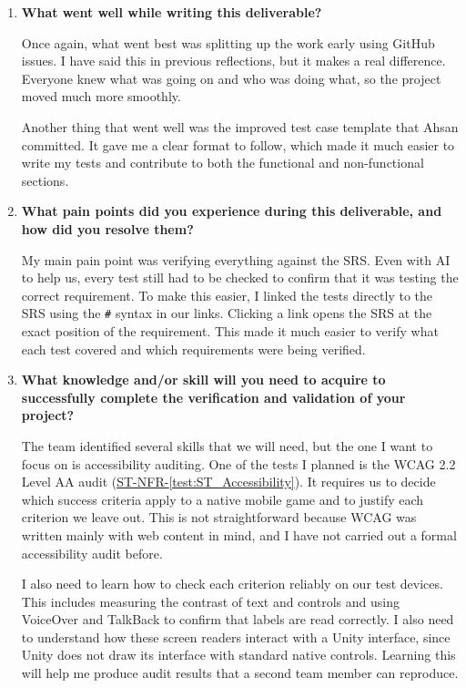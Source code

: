 \documentclass[10pt,titlepage]{article}
\newcommand{\testref}[1]{\hyperref[test:#1]{ST-NFR-\ref*{test:#1}}}
\begin{document}
\begin{enumerate}

    \item \textbf{What went well while writing this deliverable?}

    Once again, what went best was splitting up the work early using GitHub
    issues. I have said this in previous reflections, but it makes a real
    difference. Everyone knew what was going on and who was doing what, so the
    project moved much more smoothly.

    Another thing that went well was the improved test case template that Ahsan
    committed. It gave me a clear format to follow, which made it much easier
    to write my tests and contribute to both the functional and non-functional
    sections.

    \item \textbf{What pain points did you experience during this
    deliverable, and how did you resolve them?}

    My main pain point was verifying everything against the SRS. Even with AI
    to help us, every test still had to be checked to confirm that it was
    testing the correct requirement. To make this easier, I linked the tests
    directly to the SRS using the \texttt{\#} syntax in our links. Clicking a
    link opens the SRS at the exact position of the requirement. This made it
    much easier to verify what each test covered and which requirements were
    being verified.

    \item \textbf{What knowledge and/or skill will you need to acquire to
    successfully complete the verification and validation of your project?}

    The team identified several skills that we will need, but the one I want to
    focus on is accessibility auditing. One of the tests I planned is the WCAG
    2.2 Level AA audit (\testref{ST_Accessibility}). It requires us to decide
    which success criteria apply to a native mobile game and to justify each
    criterion we leave out. This is not straightforward because WCAG was written
    mainly with web content in mind, and I have not carried out a formal
    accessibility audit before.

    I also need to learn how to check each criterion reliably on our test
    devices. This includes measuring the contrast of text and controls and using
    VoiceOver and TalkBack to confirm that labels are read correctly. I also
    need to understand how these screen readers interact with a Unity interface,
    since Unity does not draw its interface with standard native controls.
    Learning this will help me produce audit results that a second team member
    can reproduce.


\end{enumerate}
\end{document}
